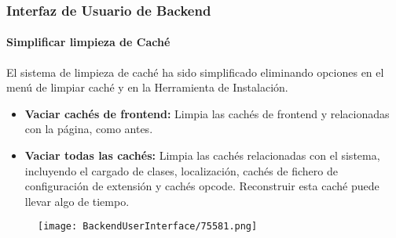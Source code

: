 \begin{frame}[fragile]
	\frametitle{Interfaz de Usuario de Backend}
	\framesubtitle{Simplificar limpieza de Caché}

	El sistema de limpieza de caché ha sido simplificado eliminando opciones en el menú de limpiar caché y
	en la Herramienta de Instalación.

	\begin{itemize}

		\item \textbf{Vaciar cachés de frontend:}\newline
			\small
				Limpia las cachés de frontend y relacionadas con la página, como antes.
			\normalsize

		\item \textbf{Vaciar todas las cachés:}\newline
			\small
				Limpia las cachés relacionadas con el sistema, incluyendo el cargado de clases, localización,
				cachés de fichero de configuración de extensión y cachés opcode. Reconstruir esta caché
				puede llevar algo de tiempo.
			\normalsize

	\end{itemize}

	\begin{figure}
		\texttt{[image: BackendUserInterface/75581.png]}
	\end{figure}

\end{frame}

